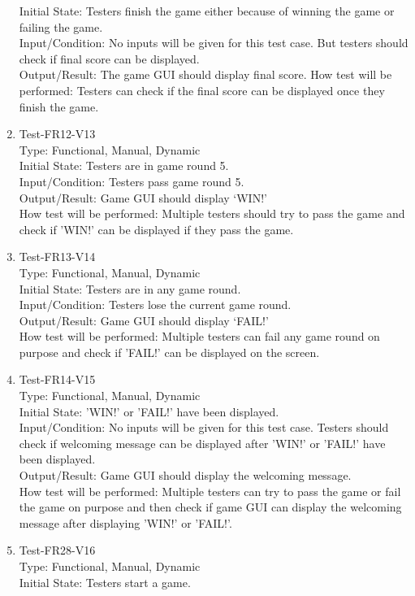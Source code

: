 \documentclass[12pt]{article}
\begin{document}
\begin{enumerate}[1.]
Initial State: Testers finish the game either because of 
winning the game or failing the game.\\
Input/Condition: No inputs will be given for this test case. But testers should check if final score can be displayed.\\
Output/Result: The game GUI should display final score.
How test will be performed: Testers can check if the final score can be displayed once they finish the game.
\item Test-FR12-V13\\
Type: Functional, Manual, Dynamic\\
Initial State: Testers are in game round 5.\\
Input/Condition: Testers pass game round 5.\\ 
Output/Result: Game GUI should display ‘WIN!’\\
How test will be performed: Multiple testers should try
to pass the game and check if 'WIN!' can be displayed 
if they pass the game.
\item Test-FR13-V14\\ 
Type: Functional, Manual, Dynamic\\
Initial State: Testers are in any game round.\\
Input/Condition: Testers lose the current game round.\\
Output/Result: Game GUI should display ‘FAIL!’\\
How test will be performed: Multiple testers can fail 
any game round on purpose and check if 'FAIL!' can 
be displayed on the screen.
\newpage
\item Test-FR14-V15\\
Type: Functional, Manual, Dynamic\\
Initial State: 'WIN!' or 'FAIL!' have been 
displayed.\\
Input/Condition: No inputs will be given for this test
case. Testers should check if welcoming message can be
displayed after 'WIN!' or 'FAIL!' have been displayed.\\ 
Output/Result: Game GUI should display the 
welcoming message.\\
How test will be performed: Multiple testers can try 
to pass the game or fail the game on purpose and then
check if game GUI can display the welcoming message after
displaying 'WIN!' or 'FAIL!'.
\item Test-FR28-V16\\
Type: Functional, Manual, Dynamic\\
Initial State: Testers start a game.\\

\end{enumerate}
\end{document}

